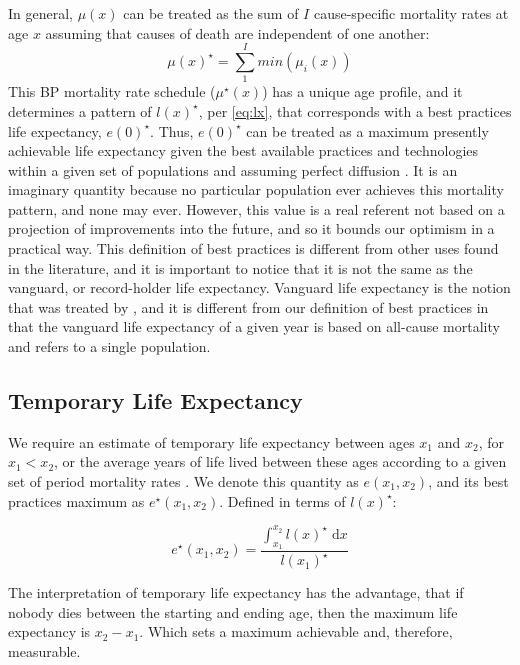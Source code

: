 \documentclass{article}
\newcommand{\dd}{\; \mathrm{d}}
\begin{document}
In general, $\mu(x)$ can be treated as the sum of $I$ cause-specific mortality
rates at age $x$ assuming that causes of death are independent of one another:
\begin{equation}
\label{eq:mxmin}
\mu(x)^{\star} = \sum_1^I min(\mu_i(x))
\end{equation}
This BP mortality rate schedule ($\mu^{\star}(x)$) has a unique
age profile, and it determines a pattern of $l(x)^{\star}$, per \eqref{eq:lx}, that corresponds with a
best practices life expectancy, $e(0)^{\star}$. Thus, $e(0)^{\star}$ can be treated as a
maximum presently achievable life expectancy given the best available
practices and technologies within a given set of populations and assuming
perfect diffusion \citep{vallin2008minimum}. It is an imaginary quantity because no particular population
ever achieves this mortality pattern, and none may ever. However, this value is
a real referent not based on a projection of improvements into the future, and
so it bounds our optimism in a practical way. This definition of best practices
is different from other uses found in the literature, and it is important to
notice that it is not the same as the vanguard, or record-holder life
expectancy. Vanguard life expectancy is the notion that was treated by
\citet{oeppen2002broken}, and it is different from our definition of best
practices in that the vanguard life expectancy of a given year is based on
all-cause mortality and refers to a single population.

\subsection*{Temporary Life Expectancy}

We require an estimate of temporary life expectancy between ages
$x_1$ and $x_2$, for $x_1<x_2$, or the average years of life lived between these ages according to a given set of period mortality rates \citep{arriaga1984}. We denote this quantity as
$e(x_1,x_2)$, and its best practices maximum as $e^{\star}(x_1,x_2)$. Defined in
terms of $l(x)^\star$:

\begin{equation}
e^{\star}(x_1,x_2) = \frac{\int _{x_1}^{x_2} l(x)^\star \dd x}{l(x_1)^\star}
\end{equation}

The interpretation of temporary life expectancy has the advantage, that if nobody dies between the starting and ending age, then the maximum life expectancy is $x_2-x_1$. Which sets a maximum achievable and, therefore, measurable.
\end{document}
